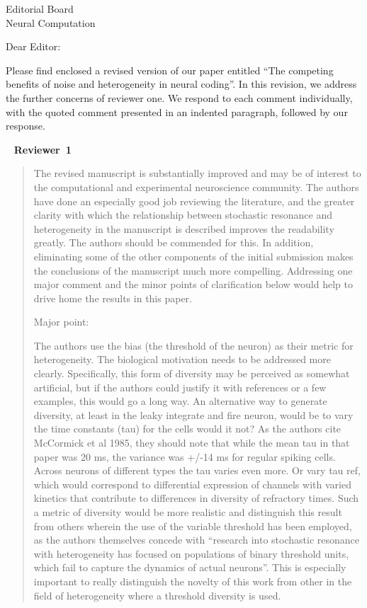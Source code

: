 \documentclass[]{letter}
\date{\today}
\begin{document}
\begin{letter}{Editorial Board\\Neural Computation}
\opening{Dear Editor:}

Please find enclosed a revised version of our paper
entitled ``The competing benefits of noise and heterogeneity in neural coding''.
In this revision, we address the further concerns of reviewer one.
We respond to each comment individually,
with the quoted comment presented in an indented paragraph,
followed by our response.

\ \newline
{\large \bf Reviewer~1}

\begin{quotation}
  The revised manuscript is substantially improved and may be of interest to the computational and experimental neuroscience community.  The authors have done an especially good job reviewing the literature, and the greater clarity with which the relationship between stochastic resonance and heterogeneity in the manuscript is described improves the readability greatly.  The authors should be commended for this.  In addition, eliminating some of the other components of the initial submission makes the conclusions of the manuscript much more compelling.  Addressing one major comment and the minor points of clarification below would help to drive home the results in this paper.

\vspace{1em}
\noindent Major point:
\vspace{0.5em}

The authors use the bias (the threshold of the neuron) as their metric for heterogeneity.  The biological motivation needs to be addressed more clearly.  Specifically, this form of diversity may be perceived as somewhat artificial, but if the authors could justify it with references or a few examples, this would go a long way.  An alternative way to generate diversity, at least in the leaky integrate and fire neuron, would be to vary the time constants (tau) for the cells would it not?  As the authors cite McCormick et al 1985, they should note that while the mean tau in that paper was 20 ms, the variance was +/-14 ms for regular spiking cells. Across neurons of different types the tau varies even more.  Or vary tau ref, which would correspond to differential expression of channels with varied kinetics that contribute to differences in diversity of refractory times.  Such a metric of diversity would be more realistic and distinguish this result from others wherein the use of the variable threshold has been employed, as the authors themselves concede with ``research into stochastic resonance with heterogeneity has focused on populations of binary threshold units, which fail to capture the dynamics of actual neurons''.  This is especially important to really distinguish the novelty of this work from other in the field of heterogeneity where a threshold diversity is used.
\end{quotation}


\end{letter}
\end{document}
